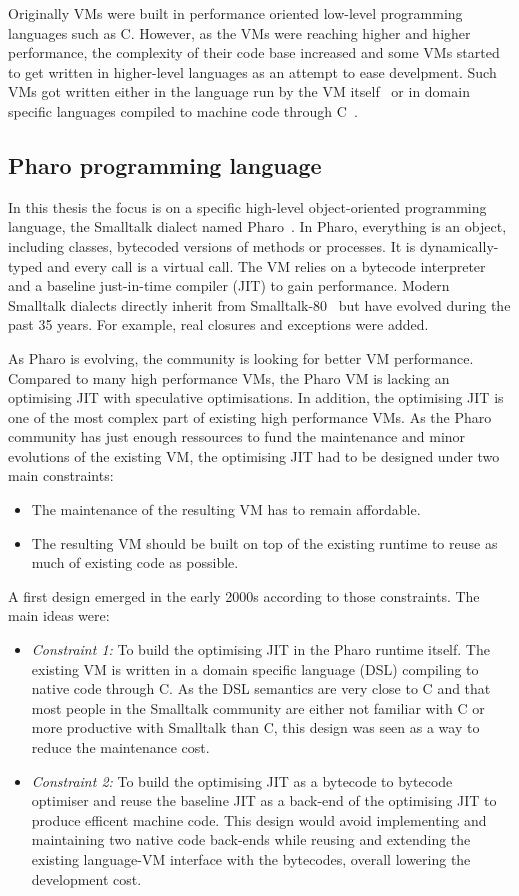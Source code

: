 \documentclass[a4paper,12pt,twoside]{../includes/ThesisStyle}
\begin{document}
Originally VMs were built in performance oriented low-level programming languages such as C. However, as the VMs were reaching higher and higher performance, the complexity of their code base increased and some VMs started to get written in higher-level languages as an attempt to ease develpment. Such VMs got written either in the language run by the VM itself~\cite{Unga05b,Wimm13a,Alp99a} or in domain specific languages compiled to machine code through C~\cite{Rigo06a,Inga97a}.

\subsection{Pharo programming language}

In this thesis the focus is on a specific high-level object-oriented programming language, the Smalltalk dialect named Pharo~\cite{Blac09a}. In Pharo, everything is an object, including classes, bytecoded versions of methods or processes. It is dynamically-typed and every call is a virtual call. The VM relies on a bytecode interpreter and a baseline just-in-time compiler (JIT) to gain performance. Modern Smalltalk dialects directly inherit from Smalltalk-80~\cite{Gold83a} but have evolved during the past 35 years. For example, real closures and exceptions were added.

As Pharo is evolving, the community is looking for better VM performance. Compared to many high performance VMs, the Pharo VM is lacking an optimising JIT with speculative optimisations. In addition, the optimising JIT is one of the most complex part of existing high performance VMs. As the Pharo community has just enough ressources to fund the maintenance and minor evolutions of the existing VM, the optimising JIT had to be designed under two main constraints:
\begin{itemize}
\item The maintenance of the resulting VM has to remain affordable.
\item The resulting VM should be built on top of the existing runtime to reuse as much of existing code as possible.
\end{itemize}

A first design emerged in the early 2000s according to those constraints. The main ideas were:
\begin{itemize}
	\item \emph{Constraint 1:} To build the optimising JIT in the Pharo runtime itself. The existing VM is written in a domain specific language (DSL) compiling to native code through C. As the DSL semantics are very close to C and that most people in the Smalltalk community are either not familiar with C or more productive with Smalltalk than C, this design was seen as a way to reduce the maintenance cost.
	\item \emph{Constraint 2:} To build the optimising JIT as a bytecode to bytecode optimiser and reuse the baseline JIT as a back-end of the optimising JIT to produce efficent machine code. This design would avoid implementing and maintaining two native code back-ends while reusing and extending the existing language-VM interface with the bytecodes, overall lowering the development cost.
\end{itemize}
\end{document}
